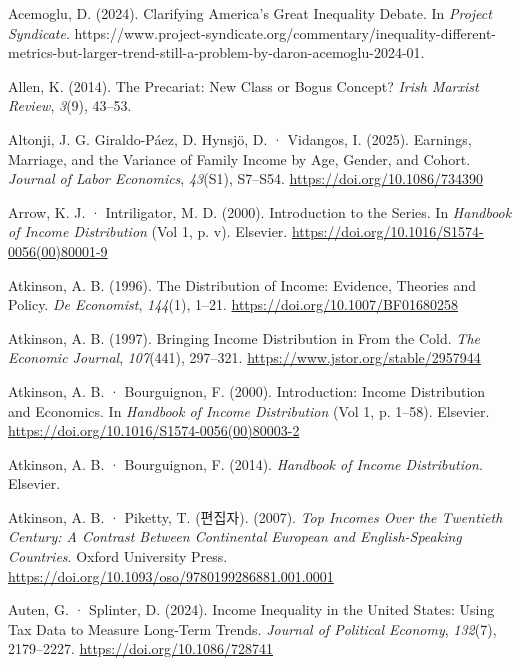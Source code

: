 \documentclass[
  letterpaper,
  DIV=11,
  numbers=noendperiod]{scrartcl}
\newlength{\cslhangindent}
\newenvironment{CSLReferences}[2] %
 {\begin{list}{}{%
  \setlength{\itemindent}{0pt}
  \setlength{\leftmargin}{0pt}
  \setlength{\parsep}{0pt}
  \ifodd #1
   \setlength{\leftmargin}{\cslhangindent}
   \setlength{\itemindent}{-1\cslhangindent}
  \fi
  \setlength{\itemsep}{#2\baselineskip}}}
 {\end{list}}
\begin{document}
\label{refs}
\begin{CSLReferences}{1}{0}
Acemoglu, D. (2024). Clarifying {America}'s {Great Inequality Debate}.
In \emph{Project Syndicate}.
https://www.project-syndicate.org/commentary/inequality-different-metrics-but-larger-trend-still-a-problem-by-daron-acemoglu-2024-01.

Allen, K. (2014). The {Precariat}: {New Class} or {Bogus Concept}?
\emph{Irish Marxist Review}, \emph{3}(9), 43--53.

Altonji, J. G. Giraldo-Páez, D. Hynsjö, D. · Vidangos, I. (2025).
Earnings, {Marriage}, and the {Variance} of {Family Income} by {Age},
{Gender}, and {Cohort}. \emph{Journal of Labor Economics},
\emph{43}(S1), S7--S54. \url{https://doi.org/10.1086/734390}

Arrow, K. J. · Intriligator, M. D. (2000). Introduction to the Series.
In \emph{Handbook of {Income Distribution}} (Vol 1, p. v). Elsevier.
\url{https://doi.org/10.1016/S1574-0056(00)80001-9}

Atkinson, A. B. (1996). The Distribution of Income: {Evidence}, Theories
and Policy. \emph{De Economist}, \emph{144}(1), 1--21.
\url{https://doi.org/10.1007/BF01680258}

Atkinson, A. B. (1997). Bringing {Income Distribution} in {From} the
{Cold}. \emph{The Economic Journal}, \emph{107}(441), 297--321.
\url{https://www.jstor.org/stable/2957944}

Atkinson, A. B. · Bourguignon, F. (2000). Introduction: {Income}
Distribution and Economics. In \emph{Handbook of {Income Distribution}}
(Vol 1, p. 1--58). Elsevier.
\url{https://doi.org/10.1016/S1574-0056(00)80003-2}

Atkinson, A. B. · Bourguignon, F. (2014). \emph{Handbook of {Income
Distribution}}. Elsevier.

Atkinson, A. B. · Piketty, T. (편집자). (2007). \emph{Top {Incomes Over}
the {Twentieth Century}: {A Contrast Between Continental European} and
{English-Speaking Countries}}. Oxford University Press.
\url{https://doi.org/10.1093/oso/9780199286881.001.0001}

Auten, G. · Splinter, D. (2024). Income {Inequality} in the {United
States}: {Using Tax Data} to {Measure Long-Term Trends}. \emph{Journal
of Political Economy}, \emph{132}(7), 2179--2227.
\url{https://doi.org/10.1086/728741}


\end{CSLReferences}
\end{document}
